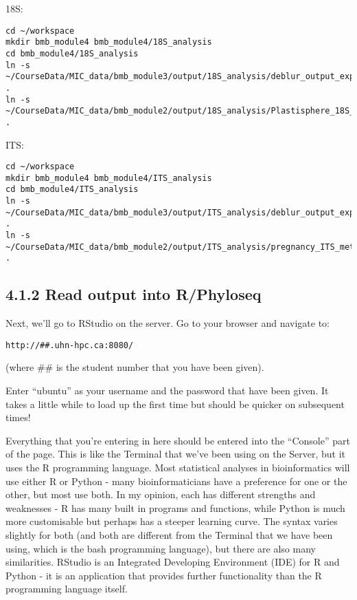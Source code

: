 \documentclass[
]{book}
\begin{document}
18S:

\begin{verbatim}
cd ~/workspace
mkdir bmb_module4 bmb_module4/18S_analysis
cd bmb_module4/18S_analysis
ln -s ~/CourseData/MIC_data/bmb_module3/output/18S_analysis/deblur_output_exported/ .
ln -s ~/CourseData/MIC_data/bmb_module2/output/18S_analysis/Plastisphere_18S_metadata.tsv .
\end{verbatim}

ITS:

\begin{verbatim}
cd ~/workspace
mkdir bmb_module4 bmb_module4/ITS_analysis
cd bmb_module4/ITS_analysis
ln -s ~/CourseData/MIC_data/bmb_module3/output/ITS_analysis/deblur_output_exported/ .
ln -s ~/CourseData/MIC_data/bmb_module2/output/ITS_analysis/pregnancy_ITS_metadata.tsv .
\end{verbatim}

\subsection{4.1.2 Read output into R/Phyloseq}\label{read-output-into-rphyloseq}

Next, we'll go to RStudio on the server. Go to your browser and navigate to:

\begin{verbatim}
http://##.uhn-hpc.ca:8080/
\end{verbatim}

(where \#\# is the student number that you have been given).

Enter ``ubuntu'' as your username and the password that have been given. It takes a little while to load up the first time but should be quicker on subsequent times!

Everything that you're entering in here should be entered into the ``Console'' part of the page. This is like the Terminal that we've been using on the Server, but it uses the R programming language. Most statistical analyses in bioinformatics will use either R or Python - many bioinformaticians have a preference for one or the other, but most use both. In my opinion, each has different strengths and weaknesses - R has many built in programs and functions, while Python is much more customisable but perhaps has a steeper learning curve. The syntax varies slightly for both (and both are different from the Terminal that we have been using, which is the bash programming language), but there are also many similarities. RStudio is an Integrated Developing Environment (IDE) for R and Python - it is an application that provides further functionality than the R programming language itself.
\end{document}
